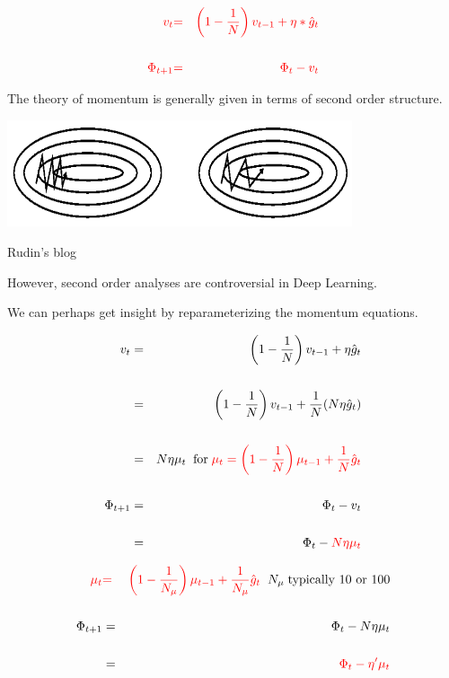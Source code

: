 {\begin{eqnarray*}
  {\color{red} v_t} & {\color{red} =} & {\color{red} \left(1-\frac{1}{N}\right) v_{t-1} + \eta * \hat{g}_t} \\
  \\
  {\color{red} \Phi_{t+1}} & {\color{red} =} & {\color{red} \Phi_t -  v_t} \\
\end{eqnarray*}

The theory of momentum is generally given in terms of second order structure.


\centerline{\includegraphics[width = 4in]{../images/momentum}}
\centerline{\Large Rudin's blog}


However, second order analyses are controversial in Deep Learning.

\vfill
We can perhaps get insight by reparameterizing the momentum equations.


\begin{eqnarray*}
v_t & = & \left(1-\frac{1}{N}\right) v_{t-1} + \eta \hat{g}_t \\
\\
& = & \left(1-\frac{1}{N}\right) v_{t-1} + \frac{1}{N}(N\eta \hat{g}_t) \\
\\
& = & N\eta\mu_t\;\;\mbox{for}\;{\color{red} \mu_t = \left(1-\frac{1}{N}\right)\mu_{t-1} + \frac{1}{N} \hat{g}_t} \\
\\
\Phi_{t+1} & = & \Phi_t - v_t \\
\\
& = & \Phi_t - {\color{red} N\eta\mu_t} 
\end{eqnarray*}


\begin{eqnarray}
{\color{red} \mu_t} & {\color{red} =} & {\color{red} \left(1-\frac{1}{N_{\mu}}\right)\mu_{t-1} + \frac{1}{N_{\mu}} \hat{g}_t}\;\;N_{\mu}\;\mbox{typically 10 or 100} \nonumber \\
\nonumber \\
\label{eq:momentum1}
\Phi_{t+1} & = & \Phi_t - N\eta\mu_t \\
\nonumber\\
 \label{eq:momentum2}
 & = & {\color{red} \Phi_t - \eta'\mu_t}
\end{eqnarray}

}
